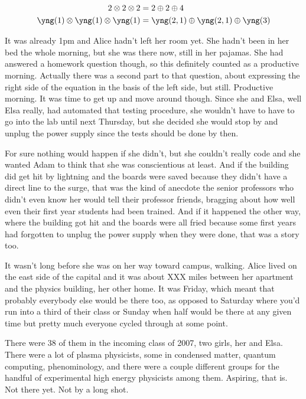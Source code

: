 {\begin{align*}
2\otimes 2\otimes 2 &= 2\oplus 2 \oplus 4 \\
\yng(1)\otimes\yng(1)\otimes\yng(1) &=
\yng(2,1)\oplus\yng(2,1)\oplus\yng(3)
\end{align*}}

\mymark

It was already 1pm and Alice hadn't left her room yet. She hadn't been in her bed the whole morning, but she was there now, still in her pajamas. She had answered a homework question though, so this definitely counted as a productive morning. Actually there was a second part to that question, about expressing the right side of the equation in the basis of the left side, but still. Productive morning. It was time to get up and move around though. Since she and Elsa, well Elsa really, had automated that testing procedure, she wouldn't have to have to go into the lab until next Thursday, but she decided she would stop by    and unplug the power supply since the tests should be done by then. 

For sure nothing would happen if she didn't, but she couldn't really code and she wanted Adam to think that she was conscientious at least. And if the building did get hit by lightning and the boards were saved because they didn't have a direct line to the surge, that was the kind of anecdote the senior professors who didn't even know her would tell their professor friends, bragging about how well even their first year students had been trained. And if it happened the other way, where the building got hit and the boards were all fried because some first years had forgotten to unplug the power supply when they were done, that was a story too.

\mypause

It wasn't long before she was on her way toward campus, walking. Alice lived on the east side of the capital and it was about XXX miles between her apartment and the physics building, her other home. It was Friday, which meant that probably everybody else would be there too, as opposed to Saturday where you'd run into a third of their class or Sunday when half would be there at any given time but pretty much everyone cycled through at some point. 

There were 38 of them in the incoming class of 2007, two girls, her and Elsa. There were a lot of plasma physicists, some in condensed matter, quantum computing, phenominology, and there were a couple different groups for the handful of experimental high energy physicists among them. Aspiring, that is. Not there yet. Not by a long shot. 

